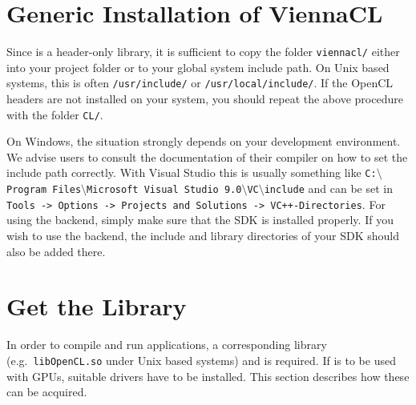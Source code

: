 
\section{Generic Installation of ViennaCL} \label{sec:viennacl-installation}
Since {\ViennaCL} is a header-only library, it is sufficient to copy the folder
\lstinline|viennacl/| either into your project folder or to your global system
include path. On Unix based systems, this is often \lstinline|/usr/include/| or
\lstinline|/usr/local/include/|. If the OpenCL headers are not installed on your system,
you should repeat the above procedure with the folder \lstinline|CL/|.

On Windows, the situation strongly depends on your development environment. We advise users
to consult the documentation of their compiler on how to set the include path correctly.
With Visual Studio this is usually something like \texttt{C:$\setminus$Program Files$\setminus$Microsoft Visual Studio 9.0$\setminus$VC$\setminus$include}
and can be set in \texttt{Tools -> Options -> Projects and Solutions -> VC++-\-Directories}.
For using the {\CUDA} backend, simply make sure that the {\CUDA} SDK is installed properly.
If you wish to use the {\OpenCL} backend, the include and library directories of your {\OpenCL} SDK should also be added there.



\section{Get the {\OpenCL} Library}
\label{opencllibs}
In order to compile and run {\OpenCL} applications, a corresponding library
(e.g.~\texttt{libOpenCL.so} under Unix based systems) and is required.
If {\OpenCL} is to be used with GPUs, suitable drivers have to be installed. This section describes how these can be acquired.

